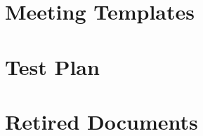 \documentclass{article}
\begin{document}
\newpage


\newpage
\section{Meeting Templates}

\newpage


\newpage
\section{Test Plan}

\newpage


\newpage
\section{Retired Documents}

\newpage


\newpage


\newpage


\newpage

\end{document}
